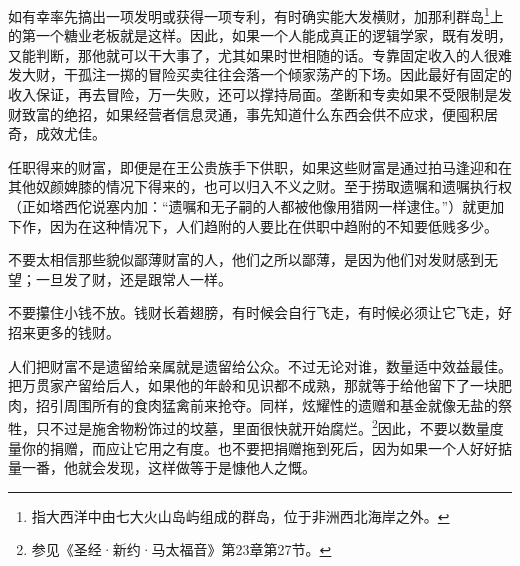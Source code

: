 \par 如有幸率先搞出一项发明或获得一项专利，有时确实能大发横财，加那利群岛\footnote{指大西洋中由七大火山岛屿组成的群岛，位于非洲西北海岸之外。}上的第一个糖业老板就是这样。因此，如果一个人能成真正的逻辑学家，既有发明，又能判断，那他就可以干大事了，尤其如果时世相随的话。专靠固定收入的人很难发大财，干孤注一掷的冒险买卖往往会落一个倾家荡产的下场。因此最好有固定的收入保证，再去冒险，万一失败，还可以撑持局面。垄断和专卖如果不受限制是发财致富的绝招，如果经营者信息灵通，事先知道什么东西会供不应求，便囤积居奇，成效尤佳。
\par 任职得来的财富，即便是在王公贵族手下供职，如果这些财富是通过拍马逢迎和在其他奴颜婢膝的情况下得来的，也可以归入不义之财。至于捞取遗嘱和遗嘱执行权（正如塔西佗说塞内加：“遗嘱和无子嗣的人都被他像用猎网一样逮住。”）就更加下作，因为在这种情况下，人们趋附的人要比在供职中趋附的不知要低贱多少。
\par 不要太相信那些貌似鄙薄财富的人，他们之所以鄙薄，是因为他们对发财感到无望；一旦发了财，还是跟常人一样。
\par 不要攥住小钱不放。钱财长着翅膀，有时候会自行飞走，有时候必须让它飞走，好招来更多的钱财。
\par 人们把财富不是遗留给亲属就是遗留给公众。不过无论对谁，数量适中效益最佳。把万贯家产留给后人，如果他的年龄和见识都不成熟，那就等于给他留下了一块肥肉，招引周围所有的食肉猛禽前来抢夺。同样，炫耀性的遗赠和基金就像无盐的祭牲，只不过是施舍物粉饰过的坟墓，里面很快就开始腐烂。\footnote{参见《圣经·新约·马太福音》第23章第27节。}因此，不要以数量度量你的捐赠，而应让它用之有度。也不要把捐赠拖到死后，因为如果一个人好好掂量一番，他就会发现，这样做等于是慷他人之慨。



